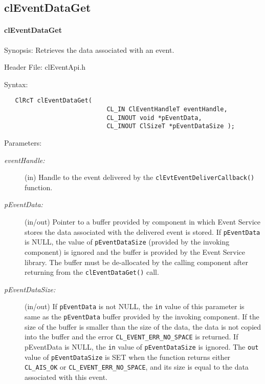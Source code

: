 \begin{flushleft}
\subsection{clEventDataGet}
\hypertarget{pageem111}{}\paragraph{cl\-Event\-Data\-Get}\label{pageem111}
\begin{Desc}
\item[Synopsis:]Retrieves the data associated with an event.\end{Desc}
\begin{Desc}
\item[Header File:]clEventApi.h\end{Desc}
\begin{Desc}
\item[Syntax:]

\footnotesize\begin{verbatim}   ClRcT clEventDataGet(
              				CL_IN ClEventHandleT eventHandle,
              				CL_INOUT void *pEventData,
              				CL_INOUT ClSizeT *pEventDataSize );
\end{verbatim}
\normalsize
\end{Desc}
\begin{Desc}
\item[Parameters:]
\begin{description}
\item[{\em event\-Handle:}](in) Handle to the event delivered by the {\tt{clEvtEventDeliverCallback()}} function.\par
 \par
 \item[{\em p\-Event\-Data:}](in/out) Pointer to a buffer provided by component in which Event Service stores the data associated with the delivered 
 event is stored. If {\tt{pEventData}} is NULL, the value of {\tt{pEventDataSize}} (provided by the invoking component) is ignored and the buffer is 
 provided by the Event Service library. The buffer must be de-allocated by the calling component after returning from the {\tt{clEventDataGet()}} call. 
 
 \item[{\em p\-Event\-Data\-Size:}](in/out) If {\tt{pEventData}} is not NULL, the {\tt{in}} value of this parameter is same as the {\tt{pEventData}} 
 buffer  provided by the  invoking component. 
If the size of the buffer is smaller than the size of the data, the data is not copied into the buffer and the error 
{\tt{CL\_\-EVENT\_\-ERR\_\-NO\_\-SPACE}} is returned. 
If pEventData is NULL, the {\tt{in}} value of {\tt{pEventDataSize}} is ignored. The {\tt{out}} value of {\tt{pEventDataSize}} is SET when the function 
returns either {\tt{CL\_\-AIS\_\-OK}} or {\tt{CL\_\-EVENT\_\-ERR\_\-NO\_\-SPACE}}, and its size is equal to the data associated with this event. 


\end{description}
\end{Desc}
\end{flushleft}
